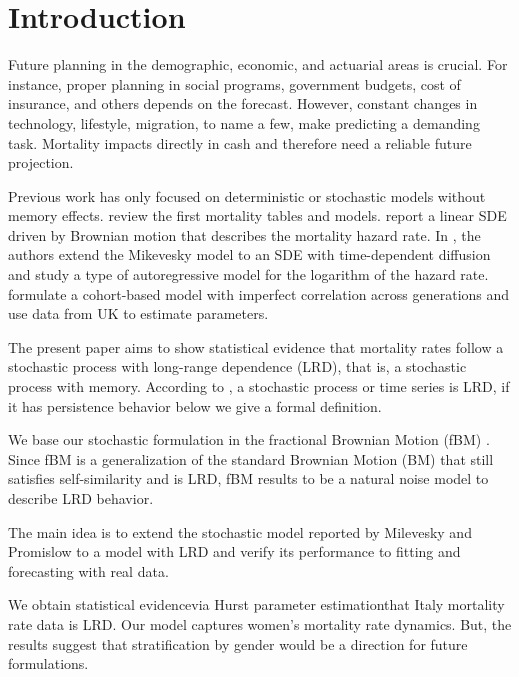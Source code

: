 \documentclass[smallextended]{svjour3}
\begin{document}
\section{Introduction}
\label{intro}

        Future planning in the demographic, economic, and actuarial areas is
    crucial. For instance, proper planning in social programs, government
    budgets, cost of insurance, and others depends on the forecast. However,
    constant changes in technology, lifestyle, migration, to name a few, make
    predicting a demanding task.  Mortality impacts directly in cash and
    therefore need a reliable future projection.


        Previous work has only focused on deterministic or stochastic models
    without memory effects. \cite{pitacco2009modelling} review 
    the first mortality tables and models.
    \cite{mi-pr} report a linear SDE driven by Brownian motion that describes
    the mortality hazard rate. In \cite{gi-or-be}, the authors extend the
    Mikevesky model to an SDE with time-dependent diffusion and study a type of
    autoregressive model for the logarithm of the hazard rate.   
    \cite{je-lu-vi} formulate a cohort-based model with imperfect correlation
    across generations and use data from UK to estimate parameters.

        The present paper aims to show statistical evidence that mortality rates
    follow a stochastic process with long-range dependence (LRD), that is,
    a stochastic process with memory. According to \cite{ra}, a stochastic
    process or time series is LRD, if it has persistence behavior\textemdash
    below we give a formal definition.

        We base our stochastic formulation in the fractional Brownian Motion (fBM)
    \cite{ma-va}. Since fBM is a generalization of the standard Brownian Motion (BM)
    that still satisfies self-similarity and is LRD, fBM results to be a natural
    noise model to describe LRD behavior.

        The main idea is to extend the stochastic model reported by 
    Milevesky and Promislow to a model with LRD and verify its performance 
    to fitting and forecasting with real data.  

    	We obtain statistical evidence\textemdash via Hurst parameter 
    estimation\textemdash that Italy mortality rate data is LRD. Our model 
    captures women's mortality rate dynamics. But, the results suggest 
    that stratification by gender would be a direction for future formulations.
   
\end{document}

